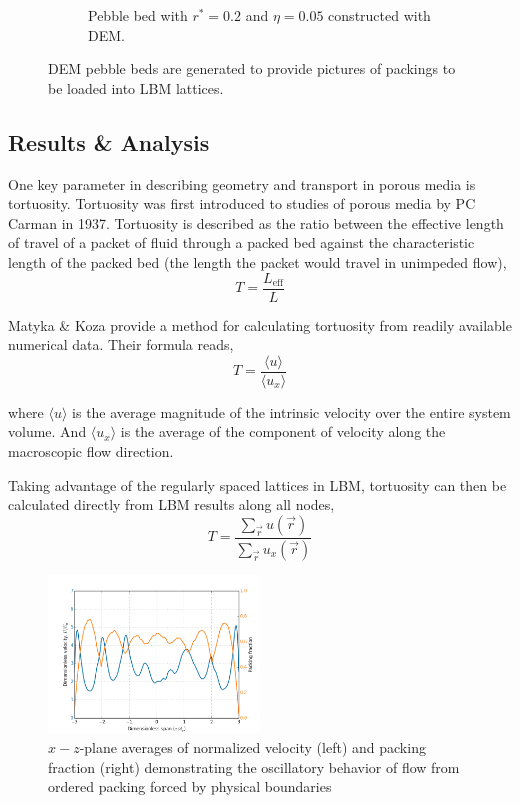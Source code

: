 \begin{figure}[!ht]
\begin{subfigure}[b]{0.44\textwidth}
        \caption{Pebble bed with $r^* = 0.2$ and $\eta = 0.05$ constructed with DEM.}\label{fig:lbm-crushed}
    \end{subfigure}
    \caption{DEM pebble beds are generated to provide pictures of packings to be loaded into LBM lattices.}\label{fig:dem-for-lbm}
\end{figure}



\subsection{Results \& Analysis}
One key parameter in describing geometry and transport in porous media is tortuosity. Tortuosity was first introduced to studies of porous media by PC Carman in 1937.\cite{Carman1997} Tortuosity is described as the ratio between the effective length of travel of a packet of fluid through a packed bed against the characteristic length of the packed bed (the length the packet would travel in unimpeded flow),
\begin{equation}
T = \frac{L_\text{eff}}{L}
\end{equation}

Matyka \& Koza provide a method for calculating tortuosity from readily available numerical data.\cite{Matyka2011} Their formula reads,
\begin{equation}\label{eq:tortuosity}
T = \frac{\langle u \rangle}{\langle u_x \rangle}
\end{equation}

where $\langle u \rangle$ is the average magnitude of the intrinsic velocity over the entire system volume. And $\langle u_x \rangle$ is the average of the component of velocity along the macroscopic flow direction.

Taking advantage of the regularly spaced lattices in LBM, tortuosity can then be calculated directly from LBM results along all nodes,
\begin{equation}
T = \frac{\sum_{\vec{r}}u(\vec{r})}{\sum_{\vec{r}} u_x(\vec{r})}
\end{equation}


\begin{figure}[!t]
    \centering
    \includegraphics[width = 0.5\textwidth]{figures/lbm/y-phi-v-profiles-filled.png}
    \caption{$x-z$-plane averages of normalized velocity (left) and packing fraction (right) demonstrating the oscillatory behavior of flow from ordered packing forced by physical boundaries}\label{fig:y-phi-v-profiles-filled}
\end{figure}

